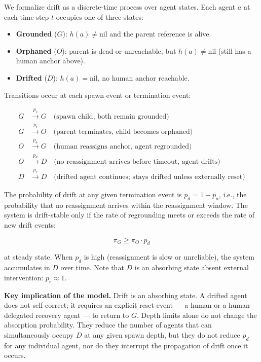 We formalize drift as a discrete-time process over agent states. Each agent $a$ at each time step $t$ occupies one of three states:

\begin{itemize}
\item \textbf{Grounded} ($G$): $h(a) \neq \text{nil}$ and the parent reference is alive.
\item \textbf{Orphaned} ($O$): parent is dead or unreachable, but $h(a) \neq \text{nil}$ (still has a human anchor above).
\item \textbf{Drifted} ($D$): $h(a) = \text{nil}$, no human anchor reachable.
\end{itemize}

Transitions occur at each spawn event or termination event:

\[
\begin{aligned}
G &\xrightarrow{p_s} G \quad \text{(spawn child, both remain grounded)} \\
G &\xrightarrow{p_t} O \quad \text{(parent terminates, child becomes orphaned)} \\
O &\xrightarrow{p_a} G \quad \text{(human reassigns anchor, agent regrounded)} \\
O &\xrightarrow{p_d} D \quad \text{(no reassignment arrives before timeout, agent drifts)} \\
D &\xrightarrow{p_r} D \quad \text{(drifted agent continues; stays drifted unless externally reset)}
\end{aligned}
\]

The probability of drift at any given termination event is $p_d = 1 - p_a$, i.e., the probability that no reassignment arrives within the reassignment window. The system is drift-stable only if the rate of regrounding meets or exceeds the rate of new drift events:

\[
\pi_G \geq \pi_O \cdot p_d
\]

at steady state. When $p_d$ is high (reassignment is slow or unreliable), the system accumulates in $D$ over time. Note that $D$ is an absorbing state absent external intervention: $p_r \approx 1$.

\medskip
\noindent \textbf{Key implication of the model.} Drift is an absorbing state. A drifted agent does not self-correct; it requires an explicit reset event --- a human or a human-delegated recovery agent --- to return to $G$. Depth limits alone do not change the absorption probability. They reduce the number of agents that can simultaneously occupy $D$ at any given spawn depth, but they do not reduce $p_d$ for any individual agent, nor do they interrupt the propagation of drift once it occurs.

